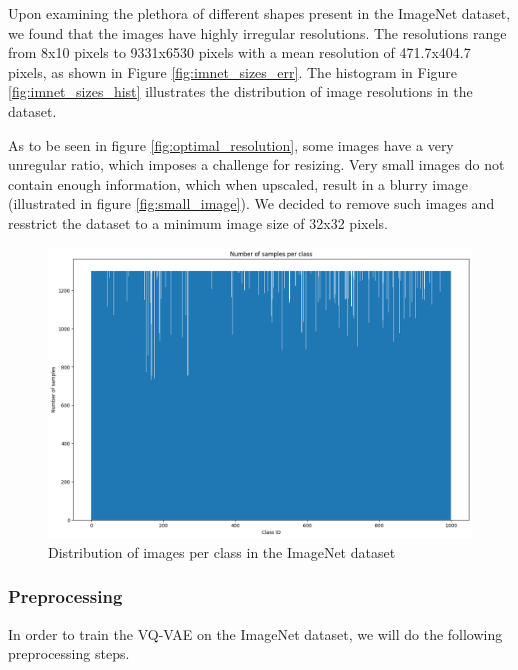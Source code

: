     Upon examining the plethora of different shapes present in the ImageNet dataset, we found that the images have highly irregular resolutions. The resolutions range from 8x10 pixels to 9331x6530 pixels with a mean resolution of 471.7x404.7 pixels, as shown in Figure \ref{fig:imnet_sizes_err}. The histogram in Figure \ref{fig:imnet_sizes_hist} illustrates the distribution of image resolutions in the dataset.

    As to be seen in figure \ref{fig:optimal_resolution}, some images have a very unregular ratio, which imposes a challenge for resizing. Very small images do not contain enough information, which when upscaled, result in a blurry image (illustrated in figure \ref{fig:small_image}). We decided to remove such images and resstrict the dataset to a minimum image size of 32x32 pixels.

    \begin{figure}
        \centering
        \includegraphics[width=\textwidth]{../../sample_images/imagenet_dist.png}
        \caption{Distribution of images per class in the ImageNet dataset}
        \label{fig:imnet_dist}
    \end{figure}

    \subsubsection{Preprocessing}
    In order to train the VQ-VAE on the ImageNet dataset, we will do the following preprocessing steps.


